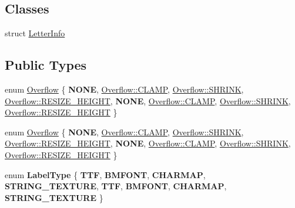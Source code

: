 \subsection*{Classes}
\begin{DoxyCompactItemize}
\item 
struct \hyperlink{structLabel_1_1LetterInfo}{Letter\+Info}
\end{DoxyCompactItemize}
\subsection*{Public Types}
\begin{DoxyCompactItemize}
\item 
enum \hyperlink{classLabel_af7d31998ea743e8ca64eb1a983fa6a4c}{Overflow} \{ \newline
{\bfseries N\+O\+NE}, 
\hyperlink{classLabel_af7d31998ea743e8ca64eb1a983fa6a4caecf301fe86e23bb2bf5155bbef3b1345}{Overflow\+::\+C\+L\+A\+MP}, 
\hyperlink{classLabel_af7d31998ea743e8ca64eb1a983fa6a4ca7505f647dc2c54b8fb665d1a7c34c5aa}{Overflow\+::\+S\+H\+R\+I\+NK}, 
\hyperlink{classLabel_af7d31998ea743e8ca64eb1a983fa6a4ca25ddd126af75d0a6b8e195603cad17eb}{Overflow\+::\+R\+E\+S\+I\+Z\+E\+\_\+\+H\+E\+I\+G\+HT}, 
\newline
{\bfseries N\+O\+NE}, 
\hyperlink{classLabel_af7d31998ea743e8ca64eb1a983fa6a4caecf301fe86e23bb2bf5155bbef3b1345}{Overflow\+::\+C\+L\+A\+MP}, 
\hyperlink{classLabel_af7d31998ea743e8ca64eb1a983fa6a4ca7505f647dc2c54b8fb665d1a7c34c5aa}{Overflow\+::\+S\+H\+R\+I\+NK}, 
\hyperlink{classLabel_af7d31998ea743e8ca64eb1a983fa6a4ca25ddd126af75d0a6b8e195603cad17eb}{Overflow\+::\+R\+E\+S\+I\+Z\+E\+\_\+\+H\+E\+I\+G\+HT}
 \}
\item 
enum \hyperlink{classLabel_af7d31998ea743e8ca64eb1a983fa6a4c}{Overflow} \{ \newline
{\bfseries N\+O\+NE}, 
\hyperlink{classLabel_af7d31998ea743e8ca64eb1a983fa6a4caecf301fe86e23bb2bf5155bbef3b1345}{Overflow\+::\+C\+L\+A\+MP}, 
\hyperlink{classLabel_af7d31998ea743e8ca64eb1a983fa6a4ca7505f647dc2c54b8fb665d1a7c34c5aa}{Overflow\+::\+S\+H\+R\+I\+NK}, 
\hyperlink{classLabel_af7d31998ea743e8ca64eb1a983fa6a4ca25ddd126af75d0a6b8e195603cad17eb}{Overflow\+::\+R\+E\+S\+I\+Z\+E\+\_\+\+H\+E\+I\+G\+HT}, 
\newline
{\bfseries N\+O\+NE}, 
\hyperlink{classLabel_af7d31998ea743e8ca64eb1a983fa6a4caecf301fe86e23bb2bf5155bbef3b1345}{Overflow\+::\+C\+L\+A\+MP}, 
\hyperlink{classLabel_af7d31998ea743e8ca64eb1a983fa6a4ca7505f647dc2c54b8fb665d1a7c34c5aa}{Overflow\+::\+S\+H\+R\+I\+NK}, 
\hyperlink{classLabel_af7d31998ea743e8ca64eb1a983fa6a4ca25ddd126af75d0a6b8e195603cad17eb}{Overflow\+::\+R\+E\+S\+I\+Z\+E\+\_\+\+H\+E\+I\+G\+HT}
 \}
\item 
\mbox{\label{classLabel_a3ce9bf5377f2a87821bb2552cf9f1625}} 
enum {\bfseries Label\+Type} \{ \newline
{\bfseries T\+TF}, 
{\bfseries B\+M\+F\+O\+NT}, 
{\bfseries C\+H\+A\+R\+M\+AP}, 
{\bfseries S\+T\+R\+I\+N\+G\+\_\+\+T\+E\+X\+T\+U\+RE}, 
\newline
{\bfseries T\+TF}, 
{\bfseries B\+M\+F\+O\+NT}, 
{\bfseries C\+H\+A\+R\+M\+AP}, 
{\bfseries S\+T\+R\+I\+N\+G\+\_\+\+T\+E\+X\+T\+U\+RE}
 \}
\end{DoxyCompactItemize}
